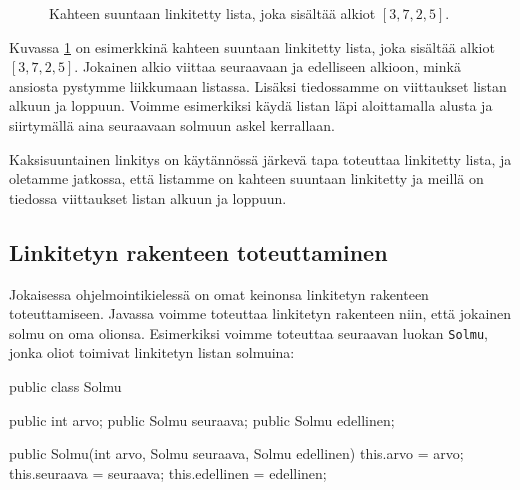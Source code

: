\begin{figure}
\center
{}
\caption{Kahteen suuntaan linkitetty lista, joka sisältää alkiot $[3,7,2,5]$.}
\label{fig:linlis}
\end{figure}

Kuvassa \ref{fig:linlis} on esimerkkinä kahteen suuntaan linkitetty lista,
joka sisältää alkiot $[3,7,2,5]$.
Jokainen alkio viittaa seuraavaan ja edelliseen alkioon,
minkä ansiosta pystymme liikkumaan listassa.
Lisäksi tiedossamme on viittaukset listan alkuun ja loppuun.
Voimme esimerkiksi käydä listan läpi aloittamalla alusta
ja siirtymällä aina seuraavaan solmuun askel kerrallaan.

Kaksisuuntainen linkitys on käytännössä järkevä tapa toteuttaa
linkitetty lista, ja oletamme jatkossa, että listamme on
kahteen suuntaan linkitetty ja meillä on tiedossa viittaukset
listan alkuun ja loppuun.

\subsection{Linkitetyn rakenteen toteuttaminen}

Jokaisessa ohjelmointikielessä on omat keinonsa
linkitetyn rakenteen toteuttamiseen.
Javassa voimme toteuttaa linkitetyn rakenteen niin,
että jokainen solmu on oma olionsa.
Esimerkiksi voimme toteuttaa seuraavan luokan \texttt{Solmu},
jonka oliot toimivat linkitetyn listan solmuina:

\begin{code}
public class Solmu {
    public int arvo;
    public Solmu seuraava;
    public Solmu edellinen;

    public Solmu(int arvo, Solmu seuraava, Solmu edellinen) {
        this.arvo = arvo;
        this.seuraava = seuraava;
        this.edellinen = edellinen;
    }
}
\end{code}

